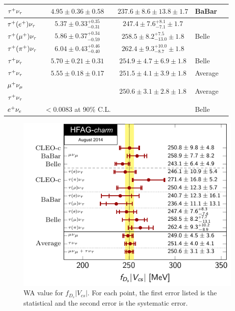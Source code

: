 \begin{table}[t!]
\begin{center}
\begin{tabular}{lccll}
\midrule
\rowcolor{LightGray}
$\tau^+\nu_{\tau}$			& $4.95\pm0.36\pm0.58$		& $237.6 \pm 8.6 \pm 13.8 \pm 1.7$   & BaBar &\\
\midrule
$\tau^+(e^+)\nu_{\tau}$  			& $5.37\pm0.33^{+0.35}_{-0.31}$ & $247.4 \pm 7.6^{+8.1}_{-7.1} \pm 1.7$  & \multirow{3}{*}{Belle} & \multirow{3}{*}{\cite{Zupanc:2013byn}} \\
$\tau^+(\mu^+)\nu_{\tau}$ 		 	& $5.86\pm0.37^{+0.34}_{-0.59}$ & $258.5 \pm 8.2^{+7.5}_{-13.0} \pm 1.8$  & &\\ 
$\tau^+(\pi^+)\nu_{\tau}$  			& $6.04\pm0.43^{+0.46}_{-0.40}$ & $262.4 \pm 9.3^{+10.0}_{-8.7} \pm 1.8$  & &\\
\midrule
\rowcolor{LightGray}
$\tau^+\nu_{\tau}$			& $5.70\pm0.21\pm0.31$		& $254.9 \pm 4.7 \pm 6.9 \pm 1.8$   & Belle & \\
\midrule
\rowcolor{Gray}
$\tau^+\nu_{\tau}$ 			& $5.55\pm0.18\pm0.17$ 		& $251.5 \pm 4.1 \pm 3.9 \pm 1.8$	& Average & \\
\midrule
\rowcolor{Gray}
$\mu^+\nu_{\mu}$  			&		 		& \multirow{2}{*}{$250.6\pm 3.1\pm 2.8\pm1.8$}	& \multirow{2}{*}{Average} & \\
\rowcolor{Gray}
$\tau^+\nu_{\tau}$ 			&		 		& \multirow{-2}{*}{$250.6\pm 3.1\pm 2.8\pm1.8$}	& \multirow{-2}{*}{Average} & \\
\midrule
$e^+\nu_{e}$				& $<0.0083$ at 90\% C.L.	& 					& Belle & \cite{Zupanc:2013byn} \\
\bottomrule
\end{tabular}
\end{center}
\end{table}
\begin{figure}[hbt!]
\centering
\includegraphics[width=1\textwidth]{figures/charm/fDsVcs.pdf}
\caption{
WA value for $f_{D_s}|V_{cs}|$. For each point, the first error listed is the statistical and the second error is the systematic error.
\label{fig:ExpDsLeptonic}
}
\end{figure}


